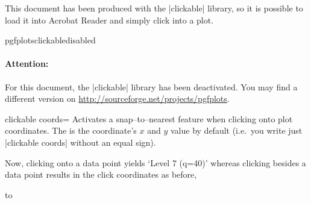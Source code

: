 	This document has been produced with the |clickable| library, so it is possible to load it into Acrobat Reader and simply click into a plot.
	
	\expandafter\ifx\csname pgfplotsclickabledisabled\endcsname\relax
	\else
	\paragraph{Attention:} For this document, the |clickable| library has been deactivated. You may find a different version on \url{http://sourceforge.net/projects/pgfplots}.
	\fi

\begin{pgfplotskey}{clickable coords=}
	Activates a snap--to--nearest feature when clicking onto plot coordinates. The  is the coordinate's $x$ and $y$ value by default (i.e.\ you write just |clickable coords| without an equal sign).
\begin{codeexample}[]
\end{codeexample}
	\noindent Now, clicking onto a data point yields `Level 7 (q=40)'
	whereas clicking besides a data point results in the click coordinates as before,
	
	\noindent\hbox to %


\end{pgfplotskey}
